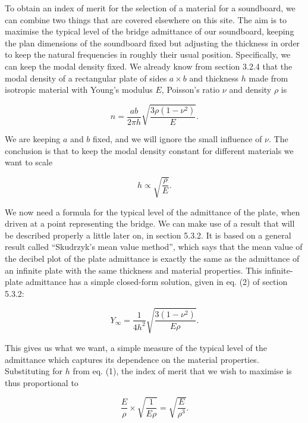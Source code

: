   To obtain an index of merit for the selection of a material for a soundboard, 
  we can combine two things that are covered elsewhere on this site. The aim is 
  to maximise the typical level of the bridge admittance of our soundboard, 
  keeping the plan dimensions of the soundboard fixed but adjusting the 
  thickness in order to keep the natural frequencies in roughly their usual 
  position. Specifically, we can keep the modal density fixed. We already know 
  from section 3.2.4 that the modal density of a rectangular plate of sides $a 
  \times b$ and thickness $h$ made from isotropic material with Young's modulus 
  $E$, Poisson's ratio $\nu$ and density $\rho$ is 

  \begin{equation*}n= \dfrac{ab}{2 \pi h} \sqrt{\dfrac{3 \rho (1-\nu^2)}{E}} . 
  \tag{1}\end{equation*} 

  We are keeping $a$ and $b$ fixed, and we will ignore the small influence of 
  $\nu$. The conclusion is that to keep the modal density constant for 
  different materials we want to scale 

  \begin{equation*}h \propto \sqrt{\dfrac{\rho}{E}} . \tag{2}\end{equation*} 

  We now need a formula for the typical level of the admittance of the plate, 
  when driven at a point representing the bridge. We can make use of a result 
  that will be described properly a little later on, in section 5.3.2. It is 
  based on a general result called ``Skudrzyk's mean value method'', which says 
  that the mean value of the decibel plot of the plate admittance is exactly 
  the same as the admittance of an infinite plate with the same thickness and 
  material properties. This infinite-plate admittance has a simple closed-form 
  solution, given in eq. (2) of section 5.3.2: 

  \begin{equation*}Y_\infty=\frac{1}{4h^2} \sqrt{\frac{3(1-\nu^2)}{E \rho}} . 
  \tag{3}\end{equation*} 

  This gives us what we want, a simple measure of the typical level of the 
  admittance which captures its dependence on the material properties. 
  Substituting for $h$ from eq. (1), the index of merit that we wish to 
  maximise is thus proportional to 

  \begin{equation*}\dfrac{E}{\rho} \times \sqrt{\dfrac{1}{E \rho}} = 
  \sqrt{\dfrac{E}{\rho^3}} . \tag{4}\end{equation*} 

